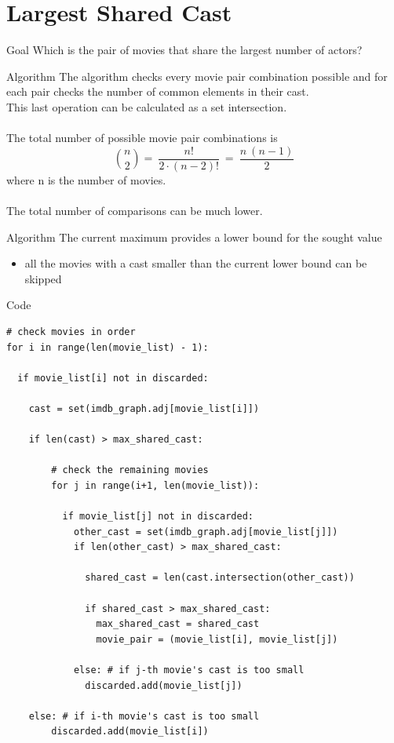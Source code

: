 \section{Largest Shared Cast}
\begin{frame}{Goal}
Which is the pair of movies that share the largest number of actors?
\end{frame}
\begin{frame}{Algorithm}
The algorithm checks every movie pair combination possible and for each pair checks the number of common elements in their cast. \\
This last operation can be calculated as a set intersection. \\ \ \\
\pause
The total number of possible movie pair combinations is 
\begin{equation*}
    \binom{n}{2} = \ \frac{n!}{2\cdot(n-2)!} \ = \ \frac{n \ (n-1)}{2}
\end{equation*}
where n is the number of movies. \\ \ \\
The total number of comparisons can be much lower.
\end{frame}
\begin{frame}{Algorithm}
The current maximum provides a lower bound for the sought value
\pause
\begin{itemize}
    \item all the movies with a cast smaller than the current lower bound can be skipped
\end{itemize}
\end{frame}
\begin{frame}[fragile]{Code}
\begin{lstlisting}[basicstyle=\ssmall\ttfamily,]
# check movies in order
for i in range(len(movie_list) - 1):

  if movie_list[i] not in discarded:
  
    cast = set(imdb_graph.adj[movie_list[i]])
    
    if len(cast) > max_shared_cast:  
        
        # check the remaining movies 
        for j in range(i+1, len(movie_list)):
             
          if movie_list[j] not in discarded:
            other_cast = set(imdb_graph.adj[movie_list[j]])
            if len(other_cast) > max_shared_cast:  
            
              shared_cast = len(cast.intersection(other_cast))
              
              if shared_cast > max_shared_cast:
                max_shared_cast = shared_cast
                movie_pair = (movie_list[i], movie_list[j])
                
            else: # if j-th movie's cast is too small
              discarded.add(movie_list[j])
              
    else: # if i-th movie's cast is too small
        discarded.add(movie_list[i])
\end{lstlisting}
\end{frame}

